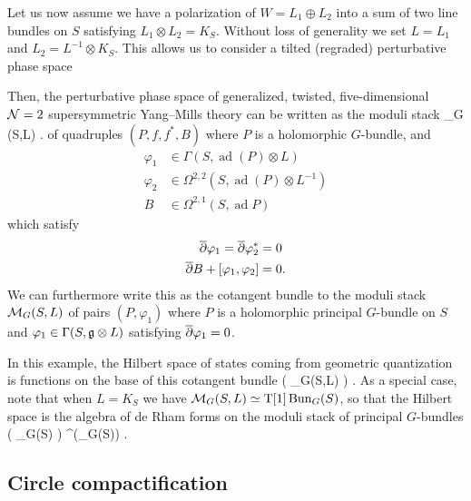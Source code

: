 \documentclass[11pt]{amsart}
\renewcommand{\op}{\operatorname}
\begin{document}
Let us now assume we have a polarization of $W = L_1 \oplus L_2$ into a sum of two line bundles on $S$ satisfying $L_1 \otimes L_2 = K_S$.
Without loss of generality we set $L = L_1$ and $L_2 = L^{-1} \otimes K_S$.
This allows us to consider a tilted (regraded) perturbative phase space
\beqn
{}
\eeqn
Then, the perturbative phase space of generalized, twisted, five-dimensional $\mathcal N=2$ supersymmetric Yang--Mills theory can be written as the moduli stack
\beqn
\op{Higgs}_G (S,L) .
\eeqn
of quadruples $(P,f, f^*,B)$ where $P$ is a holomorphic $G$-bundle, and
\begin{align*}
\varphi_1 & \in \Gamma(S, \op{ad}(P) \otimes L) \\
\varphi_2 & \in \Omega^{2,2}(S, \op{ad}(P) \otimes L^{-1}) \\
B & \in \Omega^{2,1}(S, \op{ad} P) 
\end{align*}
which satisfy
\begin{align*}
\overline{\partial} \varphi_1 = \overline{\partial} \varphi_2^* & = 0 \\
\overline{\partial} B + [\varphi_1,\varphi_2] & = 0 .
\end{align*}
We can furthermore write this as the cotangent bundle to the moduli stack $\mathcal M_{G}(S,L)$ of pairs $(P,\varphi_1)$ where $P$ is a holomorphic principal $G$-bundle on $S$ and $\varphi_1 \in \Gamma(S, \mathfrak{g} \otimes L)$ satisfying $\overline{\partial} \varphi_1 = 0$.

In this example, the Hilbert space of states coming from geometric quantization is functions on the base of this cotangent bundle
\beqn
\cO \left( \cM_{G}(S,L) \right) .
\eeqn 
As a special case, note that when $L = K_S$ we have $\cM_{G}(S,L) \simeq \T[1] \op{Bun}_G(S)$, so that the Hilbert space is the algebra of de Rham forms on the moduli stack of principal $G$-bundles
\beqn
\cO \left( \T[1] \op{Bun}_G(S) \right) \simeq \Omega^{\bu}(\op{Bun}_G(S)) .
\eeqn

\subsection{Circle compactification}
\end{document}
